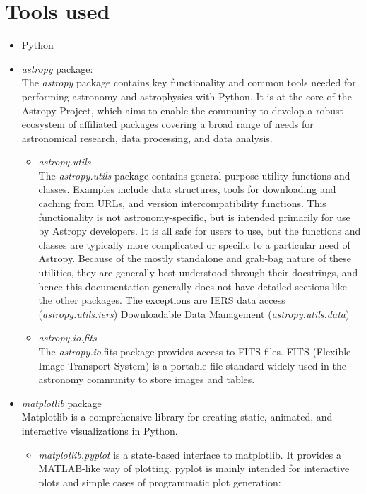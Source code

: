 \documentclass[letterpaper,11pt]{report}
\begin{document}
\section{Tools used }
\begin{itemize}
    \item Python 
    \item \emph{astropy} package: \\
        The \emph{astropy} package contains key functionality and common tools needed for performing astronomy and astrophysics with Python. It is at the core of the Astropy Project, which aims to enable the community to develop a robust ecosystem of affiliated packages covering a broad range of needs for astronomical research, data processing, and data analysis.
        
        \begin{itemize}
            \item \emph{astropy.utils} \\
                The \emph{astropy.utils} package contains general-purpose utility functions and classes. Examples include data structures, tools for downloading and caching from URLs, and version intercompatibility functions.
                This functionality is not astronomy-specific, but is intended primarily for use by Astropy developers. It is all safe for users to use, but the functions and classes are typically more complicated or specific to a particular need of Astropy.
                Because of the mostly standalone and grab-bag nature of these utilities, they are generally best understood through their docstrings, and hence this documentation generally does not have detailed sections like the other packages. The exceptions are 
                IERS data access (\emph{astropy.utils.iers})
                Downloadable Data Management (\emph{astropy.utils.data})
            
            \item \emph{astropy.io.fits} \\
                The \emph{astropy.io}.fits package provides access to FITS files. FITS (Flexible Image Transport System) is a portable file standard widely used in the astronomy community to store images and tables.
        \end{itemize}
    \item \emph{matplotlib} package \\
        Matplotlib is a comprehensive library for creating static, animated, and interactive visualizations in Python.
        \begin{itemize}
            \item \emph{matplotlib.pyplot} is a state-based interface to matplotlib. It provides a MATLAB-like way of plotting.
            pyplot is mainly intended for interactive plots and simple cases of programmatic plot generation:
        \end{itemize}
        
\end{itemize}
\end{document}
